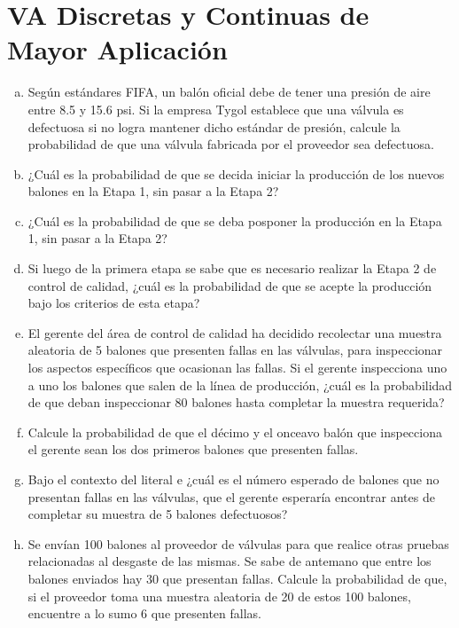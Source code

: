 \documentclass[11pt, spanish]{article}
\begin{document}
\section{VA Discretas y Continuas de Mayor Aplicación}

\begin{enumerate}[(a)]

\item Según estándares FIFA, un balón oficial debe de tener una presión de aire entre
8.5 y 15.6 psi. Si la empresa Tygol establece que una válvula es defectuosa si no logra
mantener dicho estándar de presión, calcule la probabilidad de que una válvula fabricada por
el proveedor sea defectuosa.

\item ¿Cuál es la probabilidad de que se decida iniciar la producción de los nuevos
balones en la Etapa 1, sin pasar a la Etapa 2?

\item ¿Cuál es la probabilidad de que se deba posponer la producción en la Etapa 1, sin
pasar a la Etapa 2?

\item Si luego de la primera etapa se sabe que es necesario realizar la Etapa 2 de
control de calidad, ¿cuál es la probabilidad de que se acepte la producción bajo los criterios de
esta etapa?

\item El gerente del área de control de calidad ha decidido recolectar una muestra
aleatoria de 5 balones que presenten fallas en las válvulas, para inspeccionar los aspectos
específicos que ocasionan las fallas. Si el gerente inspecciona uno a uno los balones que
salen de la línea de producción, ¿cuál es la probabilidad de que deban inspeccionar 80
balones hasta completar la muestra requerida?

\item Calcule la probabilidad de que el décimo y el onceavo balón que inspecciona el
gerente sean los dos primeros balones que presenten fallas.

\item Bajo el contexto del literal e ¿cuál es el número esperado de balones que no
presentan fallas en las válvulas, que el gerente esperaría encontrar antes de completar su
muestra de 5 balones defectuosos?

\item Se envían 100 balones al proveedor de válvulas para que realice otras pruebas
relacionadas al desgaste de las mismas. Se sabe de antemano que entre los balones
enviados hay 30 que presentan fallas. Calcule la probabilidad de que, si el proveedor toma
una muestra aleatoria de 20 de estos 100 balones, encuentre a lo sumo 6 que presenten
fallas.

\end{enumerate}
\end{document}
